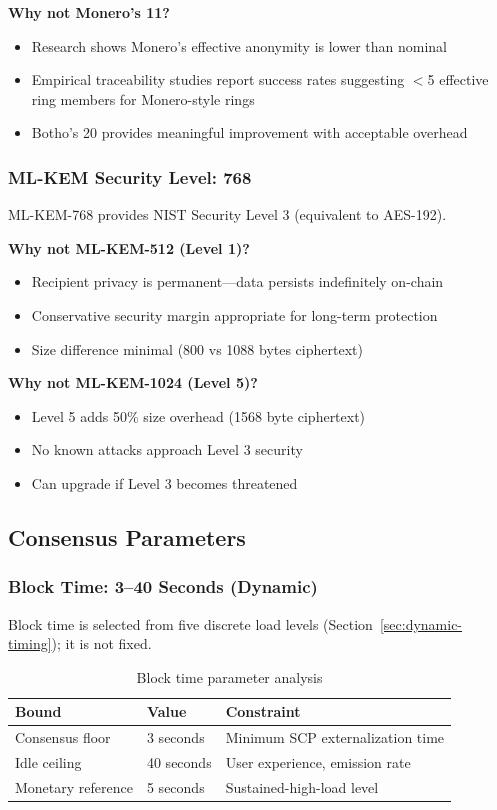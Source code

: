 \textbf{Why not Monero's 11?}
\begin{itemize}
  \item Research shows Monero's effective anonymity is lower than nominal
  \item Empirical traceability studies report success rates suggesting $<$5
    effective ring members for Monero-style rings~\cite{monerotracing}
  \item Botho's 20 provides meaningful improvement with acceptable overhead
\end{itemize}

\subsubsection{ML-KEM Security Level: 768}

ML-KEM-768 provides NIST Security Level 3 (equivalent to AES-192).

\textbf{Why not ML-KEM-512 (Level 1)?}
\begin{itemize}
  \item Recipient privacy is permanent---data persists indefinitely on-chain
  \item Conservative security margin appropriate for long-term protection
  \item Size difference minimal (800 vs 1088 bytes ciphertext)
\end{itemize}

\textbf{Why not ML-KEM-1024 (Level 5)?}
\begin{itemize}
  \item Level 5 adds 50\% size overhead (1568 byte ciphertext)
  \item No known attacks approach Level 3 security
  \item Can upgrade if Level 3 becomes threatened
\end{itemize}

\subsection{Consensus Parameters}

\subsubsection{Block Time: 3--40 Seconds (Dynamic)}

Block time is selected from five discrete load levels
(Section~\ref{sec:dynamic-timing}); it is not fixed.

\begin{table}[h]
\centering
\caption{Block time parameter analysis}
\label{tab:block-time}
\begin{tabular}{@{}lll@{}}
\toprule
\textbf{Bound} & \textbf{Value} & \textbf{Constraint} \\
\midrule
Consensus floor & 3 seconds & Minimum SCP externalization time \\
Idle ceiling & 40 seconds & User experience, emission rate \\
Monetary reference & 5 seconds & Sustained-high-load level \\
\bottomrule
\end{tabular}
\end{table}

